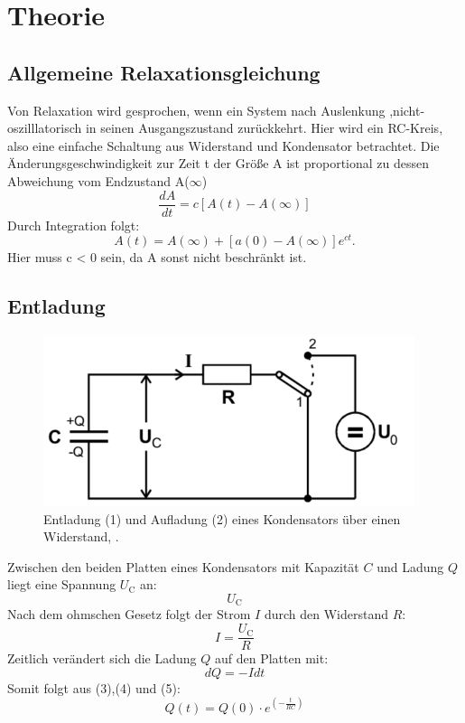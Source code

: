 \section{Theorie}
\subsection{Allgemeine Relaxationsgleichung}

Von Relaxation wird gesprochen, wenn ein System nach Auslenkung ,nicht-oszilllatorisch in seinen Ausgangszustand zurückkehrt. 
Hier wird ein RC-Kreis, also eine einfache Schaltung aus Widerstand und Kondensator betrachtet.
Die Änderungsgeschwindigkeit zur Zeit t der Größe A ist proportional zu dessen Abweichung vom Endzustand A($\infty$)
\begin{equation}
	\frac{dA}{dt} = c [A(t) - A(\infty)]
\end{equation}
Durch Integration folgt:
\begin{equation}
	A(t) = A(\infty) + [a(0) - A(\infty)] e^{ct}.
\end{equation}
Hier muss c < 0 sein, da A sonst nicht beschränkt ist.

\subsection{Entladung}
\begin{figure}[h]
  \centering
  \includegraphics[height=5cm]{Grafiken/Entladung.pdf}
  \caption{Entladung (1) und Aufladung (2) eines Kondensators über einen Widerstand, \cite{1}.}
  \label{fig:Entladung}
\end{figure}
Zwischen den beiden Platten eines Kondensators mit Kapazität $C$ und Ladung $Q$ liegt eine Spannung $U_\text{C}$ an:
\begin{equation}
	U_\text{C}
\end{equation}
Nach dem ohmschen Gesetz folgt der Strom $I$ durch den Widerstand $R$:
\begin{equation}
	I = \frac{U_\text{C}}{R}
\end{equation}
Zeitlich verändert sich die Ladung $Q$ auf den Platten mit:
\begin{equation}
	dQ = - I dt
\end{equation}
Somit folgt aus (3),(4) und (5):
\begin{equation}
	Q(t) = Q(0)\cdot e^{(-\frac{t}{RC})}
\end{equation}

